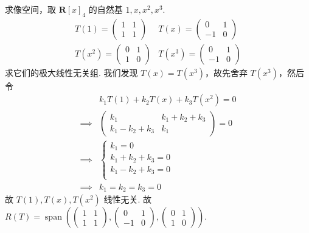 \documentclass[UTF8,12pt,a4paper,fontset=fandol]{ctexart}
\begin{document}
\begin{solve}
\begin{enumerate}
                      求像空间，取 $ \mathbf{R}[x]_4 $ 的自然基 $ 1, x, x^2, x^3 $.
                      \[ \begin{matrix}
                              T(1) = \begin{pmatrix} 1 & 1 \\ 1 & 1 \end{pmatrix}   & T(x) = \begin{pmatrix} 0 & 1 \\ -1 & 0 \end{pmatrix}   \\
                              T(x^2) = \begin{pmatrix} 0 & 1 \\ 1 & 0 \end{pmatrix} & T(x^3) = \begin{pmatrix} 0 & 1 \\ -1 & 0 \end{pmatrix}
                          \end{matrix} \]
                      求它们的极大线性无关组. 我们发现 $ T(x) = T(x^3) $，故先舍弃 $ T(x^3) $，然后令
                      \begin{align*}
                                     & k_1 T(1) + k_2 T(x) + k_3 T(x^2) = 0                                             \\
                          \implies{} & \begin{pmatrix} k_1 & k_1 + k_2 + k_3 \\ k_1 - k_2 + k_3 & k_1 \end{pmatrix} = 0 \\
                          \implies{} & \begin{cases}
                                           k_1 = 0             \\
                                           k_1 + k_2 + k_3 = 0 \\
                                           k_1 - k_2 + k_3 = 0 \\
                                       \end{cases}                                                              \\
                          \implies{} & k_1 = k_2 = k_3 = 0
                      \end{align*}
                      故 $ T(1), T(x), T(x^2) $ 线性无关. 故 $ R(T) = \operatorname{span}\left(\begin{pmatrix} 1 & 1 \\ 1 & 1 \end{pmatrix}, \begin{pmatrix} 0 & 1 \\ -1 & 0 \end{pmatrix}, \begin{pmatrix} 0 & 1 \\ 1 & 0 \end{pmatrix}\right) $.


\end{enumerate}
\end{solve}
\end{document}
